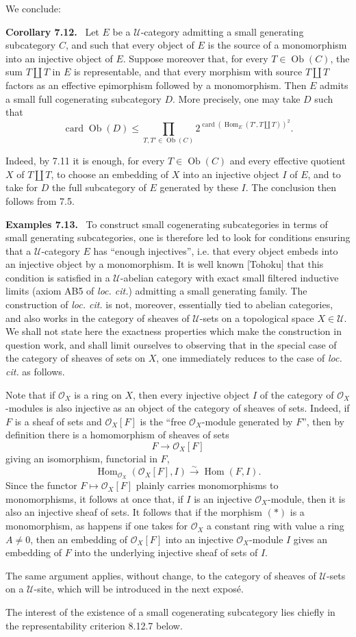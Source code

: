 \documentclass[11pt]{article}
\newcommand{\U}{\mathcal{U}}
\newcommand{\Ob}{\operatorname{Ob}}
\newcommand{\Hom}{\operatorname{Hom}}
\newcommand{\card}{\operatorname{card}}
\newenvironment{statement}[1]{\par\medskip\noindent\textbf{#1.}\ }{\par\medskip}
\begin{document}
We conclude:

\begin{statement}{Corollary 7.12}
Let $E$ be a $\U$-category admitting a small generating subcategory $C$, and such that every object of $E$ is the source of a monomorphism into an injective object of $E$. Suppose moreover that, for every $T\in\Ob(C)$, the sum $T\amalg T$ in $E$ is representable, and that every morphism with source $T\amalg T$ factors as an effective epimorphism followed by a monomorphism. Then $E$ admits a small full cogenerating subcategory $D$. More precisely, one may take $D$ such that
\[
\card\Ob(D)\leq \prod_{T,T'\in\Ob(C)}2^{\card(\Hom_E(T',T\amalg T))^2}.
\]
\end{statement}

Indeed, by 7.11 it is enough, for every $T\in\Ob(C)$ and every effective quotient $X$ of $T\amalg T$, to choose an embedding of $X$ into an injective object $I$ of $E$, and to take for $D$ the full subcategory of $E$ generated by these $I$. The conclusion then follows from 7.5.

\begin{statement}{Examples 7.13}
To construct small cogenerating subcategories in terms of small generating subcategories, one is therefore led to look for conditions ensuring that a $\U$-category $E$ has ``enough injectives'', i.e. that every object embeds into an injective object by a monomorphism. It is well known [Tohoku] that this condition is satisfied in a $\U$-abelian category with exact small filtered inductive limits (axiom AB5 of \emph{loc. cit.}) admitting a small generating family. The construction of \emph{loc. cit.} is not, moreover, essentially tied to abelian categories, and also works in the category of sheaves of $\U$-sets on a topological space $X\in\U$. We shall not state here the exactness properties which make the construction in question work, and shall limit ourselves to observing that in the special case of the category of sheaves of sets on $X$, one immediately reduces to the case of \emph{loc. cit.} as follows.

Note that if $\mathcal O_X$ is a ring on $X$, then every injective object $I$ of the category of $\mathcal O_X$-modules is also injective as an object of the category of sheaves of sets. Indeed, if $F$ is a sheaf of sets and $\mathcal O_X[F]$ is the ``free $\mathcal O_X$-module generated by $F$'', then by definition there is a homomorphism of sheaves of sets
\[
F\longrightarrow \mathcal O_X[F]\tag{$*$}
\]
giving an isomorphism, functorial in $F$,
\[
\Hom_{\mathcal O_X}(\mathcal O_X[F],I)\xrightarrow{\sim}\Hom(F,I).
\]
Since the functor $F\mapsto\mathcal O_X[F]$ plainly carries monomorphisms to monomorphisms, it follows at once that, if $I$ is an injective $\mathcal O_X$-module, then it is also an injective sheaf of sets. It follows that if the morphism $(*)$ is a monomorphism, as happens if one takes for $\mathcal O_X$ a constant ring with value a ring $A\neq0$, then an embedding of $\mathcal O_X[F]$ into an injective $\mathcal O_X$-module $I$ gives an embedding of $F$ into the underlying injective sheaf of sets of $I$.
\end{statement}

The same argument applies, without change, to the category of sheaves of $\U$-sets on a $\U$-site, which will be introduced in the next expos\'e.

The interest of the existence of a small cogenerating subcategory lies chiefly in the representability criterion 8.12.7 below.
\end{document}
